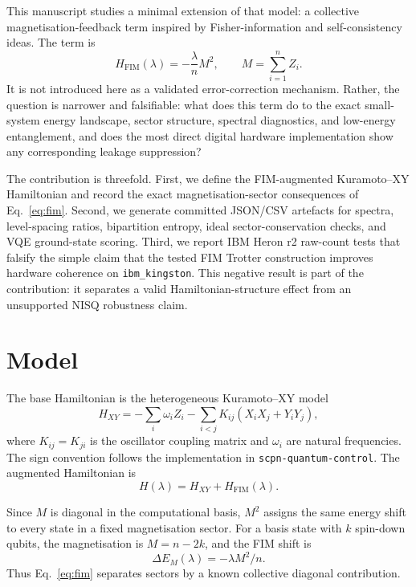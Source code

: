 \documentclass[preprint,aps,physrev,superscriptaddress,floatfix,longbibliography]{revtex4-2}
\begin{document}
This manuscript studies a minimal extension of that model: a collective
magnetisation-feedback term inspired by Fisher-information and
self-consistency ideas. The term is
%
\begin{equation}
  H_{\mathrm{FIM}}(\lambda) = -\frac{\lambda}{n} M^2,
  \qquad
  M = \sum_{i=1}^{n} Z_i.
  \label{eq:fim}
\end{equation}
%
It is not introduced here as a validated error-correction mechanism. Rather,
the question is narrower and falsifiable: what does this term do to the exact
small-system energy landscape, sector structure, spectral diagnostics, and
low-energy entanglement, and does the most direct digital hardware
implementation show any corresponding leakage suppression?

The contribution is threefold. First, we define the FIM-augmented
Kuramoto--XY Hamiltonian and record the exact magnetisation-sector consequences
of Eq.~\eqref{eq:fim}. Second, we generate committed JSON/CSV artefacts for
spectra, level-spacing ratios, bipartition entropy, ideal sector-conservation
checks, and VQE ground-state scoring. Third, we report IBM Heron r2 raw-count
tests that falsify the simple claim that the tested FIM Trotter construction
improves hardware coherence on \texttt{ibm\_kingston}. This negative result is
part of the contribution: it separates a valid Hamiltonian-structure effect
from an unsupported NISQ robustness claim.

\section{Model}

The base Hamiltonian is the heterogeneous Kuramoto--XY model
%
\begin{equation}
  H_{XY} =
  -\sum_i \omega_i Z_i
  -\sum_{i<j} K_{ij}(X_iX_j+Y_iY_j),
  \label{eq:hxy}
\end{equation}
%
where $K_{ij}=K_{ji}$ is the oscillator coupling matrix and $\omega_i$ are
natural frequencies. The sign convention follows the implementation in
\texttt{scpn-quantum-control}. The augmented Hamiltonian is
%
\begin{equation}
  H(\lambda)=H_{XY}+H_{\mathrm{FIM}}(\lambda).
  \label{eq:total}
\end{equation}

Since $M$ is diagonal in the computational basis, $M^2$ assigns the same
energy shift to every state in a fixed magnetisation sector. For a basis state
with $k$ spin-down qubits, the magnetisation is
$M=n-2k$, and the FIM shift is
%
\begin{equation}
  \Delta E_M(\lambda)=-\lambda M^2/n.
  \label{eq:sector_shift}
\end{equation}
%
Thus Eq.~\eqref{eq:fim} separates sectors by a known collective diagonal
contribution.
\end{document}
